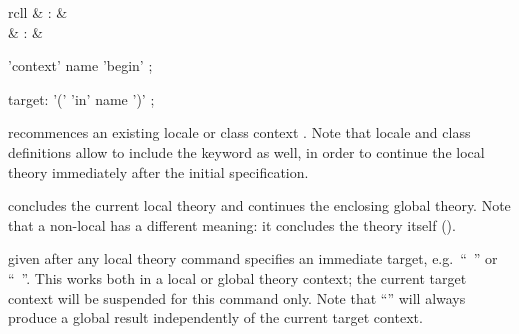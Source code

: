\begin{isabellebody}
\begin{isamarkuptext}
  \begin{matharray}{rcll}
    \hypertarget{command.context}{\hyperlink{command.context}{\mbox{}}} & : &  \\
    \hypertarget{command.end}{\hyperlink{command.end}{\mbox{}}} & : &  \\
  \end{matharray}

  \begin{rail}
    'context' name 'begin'
    ;

    target: '(' 'in' name ')'
    ;
  \end{rail}

  \begin{descr}
  
  \item [\hyperlink{command.context}{\mbox{\isa{\isacommand{context}}}}~\isa{{\isachardoublequote}c\ {\isasymBEGIN}{\isachardoublequote}}] recommences an
  existing locale or class context .  Note that locale and
  class definitions allow to include the \hyperlink{keyword.begin}{\mbox{}}
  keyword as well, in order to continue the local theory immediately
  after the initial specification.
  
  \item [\hyperlink{command.end}{\mbox{\isa{\isacommand{end}}}}] concludes the current local theory and
  continues the enclosing global theory.  Note that a non-local
  \hyperlink{command.end}{\mbox{}} has a different meaning: it concludes the theory
  itself ().
  
  \item [\isa{{\isachardoublequote}{\isacharparenleft}{\isasymIN}\ c{\isacharparenright}{\isachardoublequote}}] given after any local theory command
  specifies an immediate target, e.g.\ ``\hyperlink{command.definition}{\mbox{}}~'' or ``\hyperlink{command.theorem}{\mbox{}}~''.  This works both in a local or
  global theory context; the current target context will be suspended
  for this command only.  Note that ``\isa{{\isachardoublequote}{\isacharparenleft}{\isasymIN}\ {\isacharminus}{\isacharparenright}{\isachardoublequote}}'' will
  always produce a global result independently of the current target
  context.


\end{descr}
\end{isamarkuptext}
\end{isabellebody}
